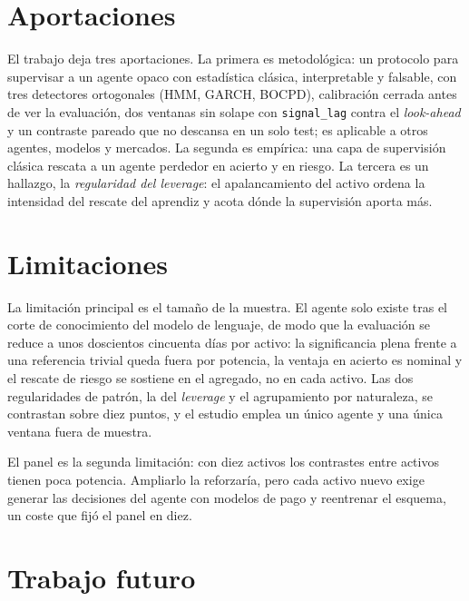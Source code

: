 \section{Aportaciones}
\label{sec:conc-aportaciones}

El trabajo deja tres aportaciones. La primera es metodológica: un protocolo para supervisar a un agente opaco con estadística clásica, interpretable y falsable, con tres detectores ortogonales (HMM, GARCH, BOCPD), calibración cerrada antes de ver la evaluación, dos ventanas sin solape con \texttt{signal\_lag} contra el \emph{look-ahead} y un contraste pareado que no descansa en un solo test; es aplicable a otros agentes, modelos y mercados. La segunda es empírica: una capa de supervisión clásica rescata a un agente perdedor en acierto y en riesgo. La tercera es un hallazgo, la \emph{regularidad del leverage}: el apalancamiento del activo ordena la intensidad del rescate del aprendiz y acota dónde la supervisión aporta más.

\section{Limitaciones}
\label{sec:conc-limitaciones}

La limitación principal es el tamaño de la muestra. El agente solo existe tras el corte de conocimiento del modelo de lenguaje, de modo que la evaluación se reduce a unos doscientos cincuenta días por activo: la significancia plena frente a una referencia trivial queda fuera por potencia, la ventaja en acierto es nominal y el rescate de riesgo se sostiene en el agregado, no en cada activo. Las dos regularidades de patrón, la del \emph{leverage} y el agrupamiento por naturaleza, se contrastan sobre diez puntos, y el estudio emplea un único agente y una única ventana fuera de muestra.

El panel es la segunda limitación: con diez activos los contrastes entre activos tienen poca potencia. Ampliarlo la reforzaría, pero cada activo nuevo exige generar las decisiones del agente con modelos de pago y reentrenar el esquema, un coste que fijó el panel en diez.

\section{Trabajo futuro}
\label{sec:conc-futuro}

